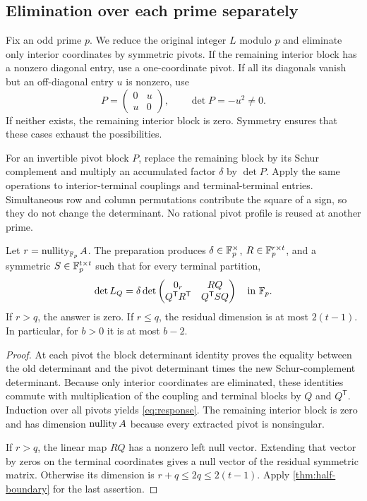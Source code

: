 \subsection{Elimination over each prime separately}

Fix an odd prime $p$. We reduce the original integer $L$ modulo $p$ and eliminate
only interior coordinates by symmetric pivots. If the remaining interior block
has a nonzero diagonal entry, use a one-coordinate pivot. If all its diagonals
vanish but an off-diagonal entry $u$ is nonzero, use
\[
                  P=\begin{pmatrix}0&u\\u&0\end{pmatrix},
                  \qquad \det P=-u^2\ne0.
\]
If neither exists, the remaining interior block is zero. Symmetry ensures that
these cases exhaust the possibilities.

For an invertible pivot block $P$, replace the remaining block by its Schur
complement and multiply an accumulated factor $\delta$ by $\det P$. Apply the
same operations to interior-terminal couplings and terminal-terminal entries.
Simultaneous row and column permutations contribute the square of a sign,
so they do not change the determinant. No rational pivot profile is reused
at another prime.

\begin{theorem}
\label{thm:response}
Let $r=\operatorname{nullity}_{\mathbb F_p}A$. The preparation produces $\delta\in\mathbb F_p^\times$,
$R\in\mathbb F_p^{r\times t}$, and a symmetric $S\in\mathbb F_p^{t\times t}$ such that
for every terminal partition,
\begin{equation}
 \det L_Q=\delta\det
 \begin{pmatrix}
       0_r&RQ\\Q^{\mathsf T}R^{\mathsf T}&Q^{\mathsf T}SQ
 \end{pmatrix}
 \quad\text{in }\mathbb F_p.
 \label{eq:response}
\end{equation}
If $r>q$, the answer is zero. If $r\le q$, the residual dimension is at most
$2(t-1)$. In particular, for $b>0$ it is at most $b-2$.
\end{theorem}
\begin{proof}
At each pivot the block determinant identity proves the equality between the
old determinant and the pivot determinant times the new Schur-complement
determinant. Because only interior coordinates are eliminated, these identities
commute with multiplication of the coupling and terminal blocks by $Q$ and
$Q^{\mathsf T}$. Induction over all pivots yields \cref{eq:response}.
The remaining interior block is zero and has dimension $\operatorname{nullity} A$ because
every extracted pivot is nonsingular.

If $r>q$, the linear map $RQ$ has a nonzero left null vector. Extending that
vector by zeros on the terminal coordinates gives a null vector of the
residual symmetric matrix. Otherwise its dimension is $r+q\le2q\le2(t-1)$.
Apply \cref{thm:half-boundary} for the last assertion.
\end{proof}

